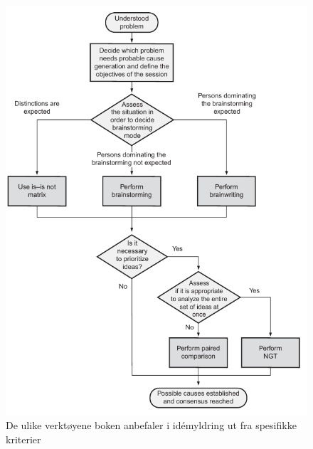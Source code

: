 \begin{figure}[H]
    \centering
    \includegraphics[scale=0.65]{main/bilder/verktoyvalg/verktoyvalg_idemyldring.pdf}
    \caption[Verktøyvalg for idémyldring]{De ulike verktøyene boken anbefaler i idémyldring ut fra spesifikke kriterier}
    \label{fig:verktoyvalg-idemyldring}
\end{figure}

